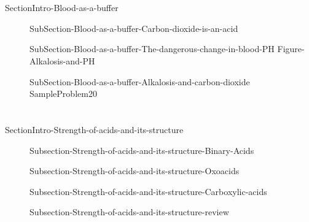 \documentclass[main.tex]{subfiles}
\newcommand\chapterlabel{Ch-acidbase}\setcounter{figurenewcounter}{0}\setcounter{tablenewcounter}{0}\setcounter{formulanewcounter}{0}
\begin{document}
\newpage
\section{\color{blue!30!black}{Blood as a buffer}}{SectionIntro-Blood-as-a-buffer}
\sloppy\begin{description}
\item[] {SubSection-Blood-as-a-buffer-Carbon-dioxide-is-an-acid}
\item[] 
{SubSection-Blood-as-a-buffer-The-dangerous-change-in-blood-PH}
{Figure-Alkalosis-and-PH}
\item[] 
{SubSection-Blood-as-a-buffer-Alkalosis-and-carbon-dioxide}
{SampleProblem20}
\end{description}

 \section{\color{blue!30!black}{Molecular mechanisms behind acid-base strength}}{SectionIntro-Strength-of-acids-and-its-structure}
\sloppy\begin{description}
\item[] {Subsection-Strength-of-acids-and-its-structure-Binary-Acids}
\item[] {Subsection-Strength-of-acids-and-its-structure-Oxoacids}
\item[] {Subsection-Strength-of-acids-and-its-structure-Carboxylic-acids}
\item[] {Subsection-Strength-of-acids-and-its-structure-review}
 \end{description}

\end{document}
